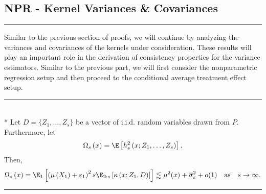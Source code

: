 \subsection{NPR - Kernel Variances \& Covariances}
\hrule
Similar to the previous section of proofs, we will continue by analyzing the variances and covariances of the kernels under consideration.
These results will play an important role in the derivation of consistency properties for the variance estimators.
Similar to the previous part, we will first consider the nonparametric regression setup and then proceed to the conditional average treatment effect setup.
\vspace{0.5cm}
\hrule
\begin{lem}\label{lem:omega_s}\mbox{}\\*
	Let $D = \{Z_1, \dotsc, Z_{s}\}$ be a vector of i.i.d. random variables drawn from $P$.
	Furthermore, let
	\begin{equation}
		\Omega_{s}\left(x\right)
		= \E\left[h_{s}^{2}\left(x; Z_1, \ldots,  Z_{s}\right)\right].
	\end{equation}
	Then,
	\begin{equation}
		\Omega_{s}\left(x\right)
		= \E_{1}\left[\left(\mu\left(X_1\right)+ \varepsilon_1\right)^2 s \E_{2:s}\left[\kappa\left(x; Z_1, D\right)\right]\right]
		\lesssim \mu^2(x) + \overline{\sigma}_{\varepsilon}^2 + o(1)
		\quad \text{as} \quad s \rightarrow \infty.
	\end{equation}
\end{lem}
\hrule

